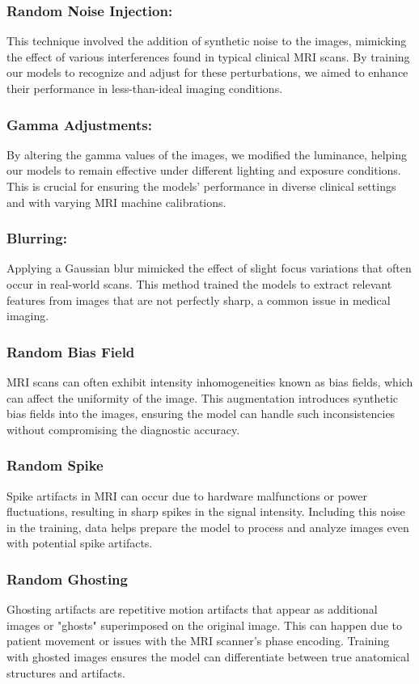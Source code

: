 \documentclass[conference,compsoc]{IEEEtran}
\begin{document}
\subsubsection{Random Noise Injection:} This technique involved the addition of synthetic noise to the images, mimicking the effect of various interferences found in typical clinical MRI scans. By training our models to recognize and adjust for these perturbations, we aimed to enhance their performance in less-than-ideal imaging conditions.

\subsubsection{Gamma Adjustments:} By altering the gamma values of the images, we modified the luminance, helping our models to remain effective under different lighting and exposure conditions. This is crucial for ensuring the models' performance in diverse clinical settings and with varying MRI machine calibrations.

\subsubsection{Blurring:} Applying a Gaussian blur mimicked the effect of slight focus variations that often occur in real-world scans. This method trained the models to extract relevant features from images that are not perfectly sharp, a common issue in medical imaging.

\subsubsection{Random Bias Field} MRI scans can often exhibit intensity inhomogeneities known as bias fields, which can affect the uniformity of the image. This augmentation introduces synthetic bias fields into the images, ensuring the model can handle such inconsistencies without compromising the diagnostic accuracy.

\subsubsection{Random Spike} Spike artifacts in MRI can occur due to hardware malfunctions or power fluctuations, resulting in sharp spikes in the signal intensity. Including this noise in the training, data helps prepare the model to process and analyze images even with potential spike artifacts.

\subsubsection{Random Ghosting} Ghosting artifacts are repetitive motion artifacts that appear as additional images or "ghosts" superimposed on the original image. This can happen due to patient movement or issues with the MRI scanner's phase encoding. Training with ghosted images ensures the model can differentiate between true anatomical structures and artifacts.
\end{document}
